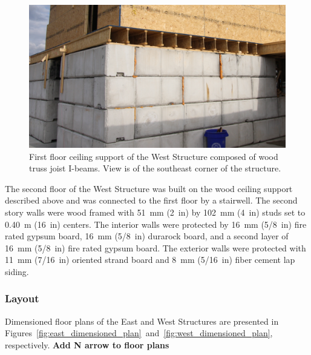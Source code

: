 \documentclass[12pt,oneside]{book}
\begin{document}
\begin{figure}[!ht]
	\includegraphics[width=6in]{../Figures/Pictures/TJI_support}
	\caption[TJI-constructed ceiling support of the West Structure.]{First floor ceiling support of the West Structure composed of wood truss joist I-beams. View is of the southeast corner of the structure.}
	\label{fig:TJI}
\end{figure}
\FloatBarrier

The second floor of the West Structure was built on the wood ceiling support described above and was connected to the first floor by a stairwell. The second story walls were wood framed with 51~mm (2~in) by 102~mm (4~in) studs set to 0.40~m (16~in) centers. The interior walls were protected by 16~mm (5/8~in) fire rated gypsum board, 16~mm (5/8~in) durarock board, and a second layer of 16~mm (5/8~in) fire rated gypsum board. The exterior walls were protected with 11~mm (7/16~in) oriented strand board and 8~mm (5/16~in) fiber cement lap siding.

\subsubsection{Layout}
\label{sec:layout}
Dimensioned floor plans of the East and West Structures are presented in Figures~\ref{fig:east_dimensioned_plan}~and~\ref{fig:west_dimensioned_plan}, respectively. \textbf{Add N arrow to floor plans}
\end{document}
